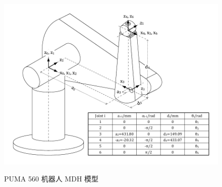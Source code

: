 \documentclass[cn,11pt,chinese,blue,bibstyle=ieeetr]{elegantbook}
\begin{document}
\begin{figure}[htbp]
	\centering
	\includegraphics[scale=1]{images//puma560_mdh.pdf} \\
	\caption{PUMA 560 机器人 MDH 模型}
	\label{puma560_mdh_model}
\end{figure}
\end{document}
